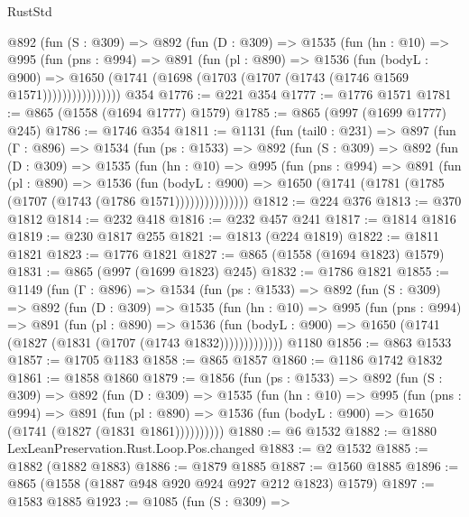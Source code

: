 \begin{lexlean}{RustStd}
\begin{coremodule}
          @892
            (fun (S : @309) =>
            @892
              (fun (D : @309) =>
              @1535
                (fun (hn : @10) =>
                @995
                  (fun (pns : @994) =>
                  @891
                    (fun (pl : @890) =>
                    @1536
                      (fun (bodyL : @900) =>
                      @1650 (@1741 (@1698 (@1703 (@1707 (@1743 (@1746 @1569 @1571))))))))))))))))
    @354
@1776 := @221 @354
@1777 := @1776 @1571
@1781 := @865 (@1558 (@1694 @1777) @1579)
@1785 := @865 (@997 (@1699 @1777) @245)
@1786 := @1746 @354
@1811 := @1131
    (fun (tail0 : @231) =>
    @897
      (fun (Γ : @896) =>
      @1534
        (fun (ps : @1533) =>
        @892
          (fun (S : @309) =>
          @892
            (fun (D : @309) =>
            @1535
              (fun (hn : @10) =>
              @995
                (fun (pns : @994) =>
                @891
                  (fun (pl : @890) =>
                  @1536
                    (fun (bodyL : @900) =>
                    @1650 (@1741 (@1781 (@1785 (@1707 (@1743 (@1786 @1571)))))))))))))))
@1812 := @224 @376
@1813 := @370 @1812
@1814 := @232 @418
@1816 := @232 @457 @241
@1817 := @1814 @1816
@1819 := @230 @1817 @255
@1821 := @1813 (@224 @1819)
@1822 := @1811 @1821
@1823 := @1776 @1821
@1827 := @865 (@1558 (@1694 @1823) @1579)
@1831 := @865 (@997 (@1699 @1823) @245)
@1832 := @1786 @1821
@1855 := @1149
    (fun (Γ : @896) =>
    @1534
      (fun (ps : @1533) =>
      @892
        (fun (S : @309) =>
        @892
          (fun (D : @309) =>
          @1535
            (fun (hn : @10) =>
            @995
              (fun (pns : @994) =>
              @891
                (fun (pl : @890) =>
                @1536
                  (fun (bodyL : @900) => @1650 (@1741 (@1827 (@1831 (@1707 (@1743 @1832)))))))))))))
    @1180
@1856 := @863 @1533
@1857 := @1705 @1183
@1858 := @865 @1857
@1860 := @1186 @1742 @1832
@1861 := @1858 @1860
@1879 := @1856
    (fun (ps : @1533) =>
    @892
      (fun (S : @309) =>
      @892
        (fun (D : @309) =>
        @1535
          (fun (hn : @10) =>
          @995
            (fun (pns : @994) =>
            @891
              (fun (pl : @890) =>
              @1536 (fun (bodyL : @900) => @1650 (@1741 (@1827 (@1831 @1861))))))))))
@1880 := @6 @1532
@1882 := @1880 LexLeanPreservation.Rust.Loop.Pos.changed
@1883 := @2 @1532
@1885 := @1882 (@1882 @1883)
@1886 := @1879 @1885
@1887 := @1560 @1885
@1896 := @865 (@1558 (@1887 @948 @920 @924 @927 @212 @1823) @1579)
@1897 := @1583 @1885
@1923 := @1085
    (fun (S : @309) =>

\end{coremodule}
\end{lexlean}
